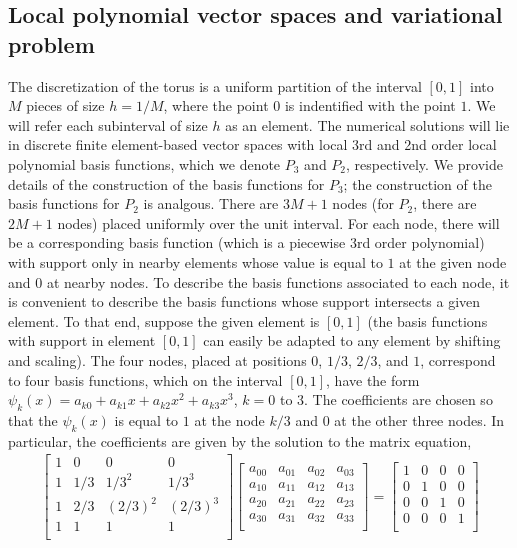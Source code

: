 \documentclass[11pt,letterpaper]{amsart}
\theoremstyle{plain}
\theoremstyle{definition}
\theoremstyle{remark}
\begin{document}
    \subsection{Local polynomial vector spaces and variational problem}
    The discretization of the torus is a uniform partition of the interval $[0,1]$ into $M$ pieces of size $h = 1/M$, 
    where the point $0$ is indentified with the point $1$. We will refer each subinterval of size $h$ as an element.  
    The numerical solutions will lie in discrete finite element-based vector spaces with local 3rd and 2nd order local polynomial basis functions, 
    which we denote $P_3$ and $P_2$, respectively. 
    We provide details of the construction of the basis functions for $P_3$; the construction of the basis functions for $P_2$ is analgous. 
    There are $3M + 1$ nodes (for $P_2$, there are $2M + 1$ nodes) placed uniformly over the unit interval.  For each node, there will be 
    a corresponding basis function (which is a piecewise 3rd order polynomial) with support only in nearby elements whose value is equal to $1$ at the given node and $0$ at nearby nodes.  
    To describe the basis functions associated to each node, it is convenient to describe the basis functions whose support intersects a given element. 
    To that end, suppose the given element is $[0,1]$ (the basis functions with support in element $[0,1]$ can easily be adapted 
    to any element by shifting and scaling).  The four nodes, placed at positions $0$, $1/3$, $2/3$, and $1$, correspond to 
    four basis functions, which on the interval $[0,1]$, have the form $\psi_k(x) = a_{k0} + a_{k1} x + a_{k2} x^2 + a_{k3} x^3$, $k = 0$ to $3$. 
    The coefficients are chosen so that the $\psi_k(x)$ is equal to $1$ at the node $k/3$ and $0$ at the other three nodes.  In particular, 
    the coefficients are given by the solution to the matrix equation,
    \begin{align*}
        \begin{bmatrix}
            1 & 0 & 0 & 0 \\
            1 & 1/3 & 1/3^2 & 1/3^3 \\
            1 & 2/3 & (2/3)^2 & (2/3)^3 \\
            1 & 1 & 1 & 1 \\
        \end{bmatrix} 
        \begin{bmatrix}
            a_{00} & a_{01} & a_{02} & a_{03} \\
            a_{10} & a_{11} & a_{12} & a_{13} \\
            a_{20} & a_{21} & a_{22} & a_{23} \\
            a_{30} & a_{31} & a_{32} & a_{33} \\
        \end{bmatrix} 
        = 
        \begin{bmatrix}
            1 & 0 & 0 & 0 \\
            0 & 1 & 0 & 0 \\
            0 & 0 & 1 & 0 \\
            0 & 0 & 0 & 1 \\
        \end{bmatrix}
    \end{align*} 
\end{document}
